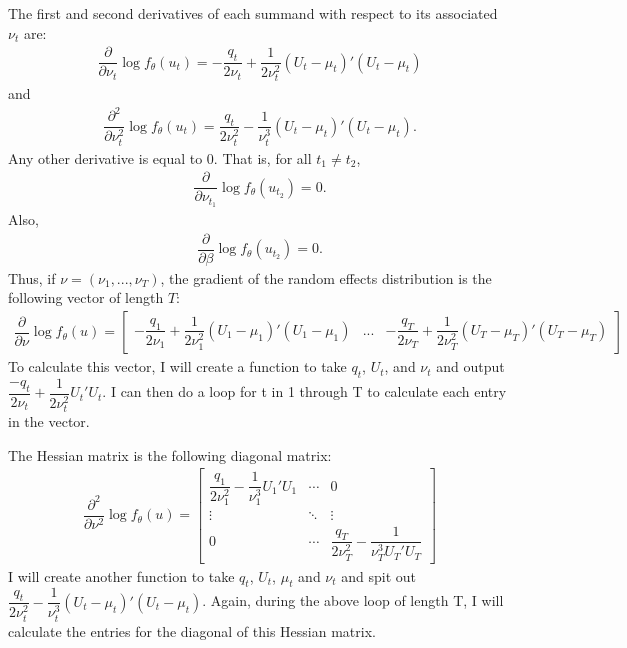 \documentclass{article}
\begin{document}
The first and second derivatives of each summand with respect to its associated $\nu_t$ are:
\begin{align}
\dfrac{\partial}{\partial \nu_t} \log f_\theta(u_t) = - \dfrac{q_t}{2 \nu_t} + \dfrac{1}{2 \nu_t^2}(U_t-\mu_t)'(U_t-\mu_t)
\end{align}
and 
\begin{align}
\dfrac{\partial^2}{\partial \nu_t^2} \log f_\theta(u_t) = \dfrac{q_t}{2 \nu_t^2}- \dfrac{1}{\nu_t^3} (U_t-\mu_t)'(U_t-\mu_t).
\end{align}
Any other derivative is equal to 0. That is, for all $t_1 \neq t_2$,
\begin{align}
\dfrac{\partial}{\partial \nu_{t_1}} \log f_\theta(u_{t_2}) = 0.
\end{align}
Also,
\begin{align}
\dfrac{\partial}{\partial \beta} \log f_\theta(u_{t_2}) = 0.
\end{align}
Thus, if $\nu = (\nu_1,...,\nu_T)$, the gradient of the random effects distribution is the following vector of length $T$:
\begin{align}
\dfrac{\partial}{\partial \nu}  \log f_\theta(u) = \begin{bmatrix} - \dfrac{q_1}{2 \nu_1} + \dfrac{1}{2 \nu_1^2} (U_1-\mu_1) ' (U_1-\mu_1) & ... & - \dfrac{q_T}{2 \nu_T} + \dfrac{1}{2 \nu_T^2} (U_T-\mu_T) '(U_T-\mu_T)   \end{bmatrix} 
\end{align}
To calculate this vector, I will create a function to take $q_t$, $U_t$, and $\nu_t$ and  output $\dfrac{-q_t}{2\nu_t} +\dfrac{1}{2 \nu_t^2} U_t'U_t$. I can then do a loop for t in 1 through T to calculate each entry in the vector.


The Hessian matrix is the following diagonal matrix:
\begin{align}
\dfrac{\partial^2}{\partial \nu^2} \log f_\theta(u) = \begin{bmatrix} \dfrac{q_1}{2 \nu_1^2}- \dfrac{1}{\nu_1^3} U_1'U_1 & \cdots & 0 \\ \vdots & \ddots & \vdots \\ 0 & \cdots & \dfrac{q_T}{2 \nu_T^2}- \dfrac{1}{\nu_T^3 U_T'U_T} \end{bmatrix}
\end{align}
I will create another function to take $q_t$, $U_t$, $\mu_t$ and $\nu_t$ and spit out $\dfrac{q_t}{2 \nu_t^2} - \dfrac{1}{\nu_t^3}  (U_t-\mu_t)' (U_t-\mu_t)$. Again, during the above loop of length T, I will calculate the entries for the diagonal of this Hessian matrix.
\end{document}
